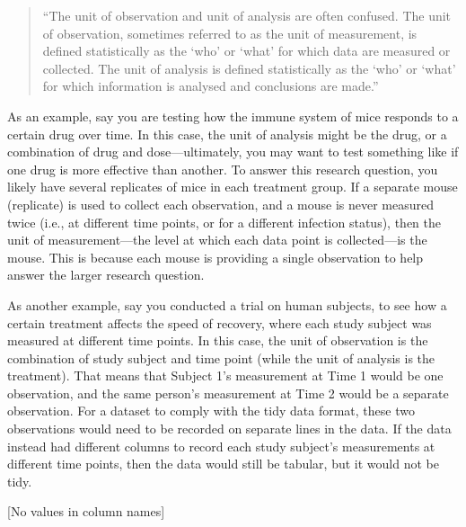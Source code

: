 \documentclass[]{tufte-book}
\begin{document}
\begin{quote}
``The unit of observation and unit of analysis are often confused.
The unit of observation, sometimes referred to as the unit of
measurement, is defined statistically as the `who' or `what'
for which data are measured or collected. The unit of analysis
is defined statistically as the `who' or `what' for which
information is analysed and conclusions are made.'' \citep{sedgwick2014unit}
\end{quote}

As an example, say you are testing how the immune system of mice responds to a
certain drug over time. In this case, the unit of analysis might be the drug,
or a combination of drug and dose---ultimately, you may want to test something
like if one drug is more effective than another. To answer this research
question, you likely have several replicates of mice in each treatment group. If
a separate mouse (replicate) is used to collect each observation, and a mouse is
never measured twice (i.e., at different time points, or for a different
infection status), then the unit of measurement---the level at which each data
point is collected---is the mouse. This is because each mouse is providing a
single observation to help answer the larger research question.

As another example, say you conducted a trial on human subjects, to see how
a certain treatment affects the speed of recovery, where each study
subject was measured at different time points. In this case, the unit of
observation is the combination of study subject and time point (while the unit
of analysis is the treatment). That means that Subject 1's measurement at Time 1 would be one
observation, and the same person's measurement at Time 2 would be a separate
observation. For a dataset to comply with the tidy data format, these two
observations would need to be recorded on separate lines in the data. If the
data instead had different columns to record each study subject's measurements
at different time points, then the data would still be tabular, but it would not
be tidy.

{[}No values in column names{]}
\end{document}
